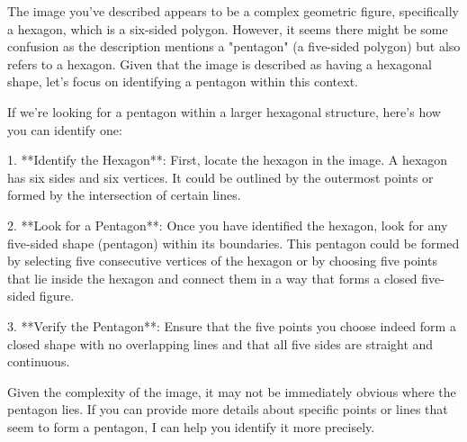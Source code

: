 The image you've described appears to be a complex geometric figure, specifically a hexagon, which is a six-sided polygon. However, it seems there might be some confusion as the description mentions a "pentagon" (a five-sided polygon) but also refers to a hexagon. Given that the image is described as having a hexagonal shape, let's focus on identifying a pentagon within this context.

If we're looking for a pentagon within a larger hexagonal structure, here’s how you can identify one:

1. **Identify the Hexagon**: First, locate the hexagon in the image. A hexagon has six sides and six vertices. It could be outlined by the outermost points or formed by the intersection of certain lines.

2. **Look for a Pentagon**: Once you have identified the hexagon, look for any five-sided shape (pentagon) within its boundaries. This pentagon could be formed by selecting five consecutive vertices of the hexagon or by choosing five points that lie inside the hexagon and connect them in a way that forms a closed five-sided figure.

3. **Verify the Pentagon**: Ensure that the five points you choose indeed form a closed shape with no overlapping lines and that all five sides are straight and continuous.

Given the complexity of the image, it may not be immediately obvious where the pentagon lies. If you can provide more details about specific points or lines that seem to form a pentagon, I can help you identify it more precisely.